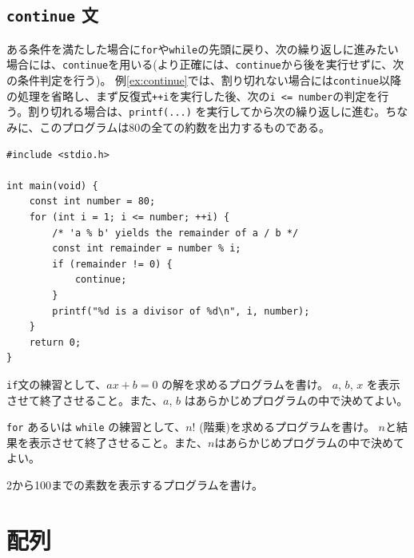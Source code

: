 \subsection{\texttt{continue} 文}
ある条件を満たした場合に\texttt{for}や\texttt{while}の先頭に戻り、次の繰り返しに進みたい場合には、\texttt{continue}を用いる(より正確には、\texttt{continue}から後を実行せずに、次の条件判定を行う)。 例\ref{ex:continue}では、割り切れない場合には\texttt{continue}以降の処理を省略し、まず反復式\texttt{++i}を実行した後、次の\texttt{i <= number}の判定を行う。割り切れる場合は、\texttt{printf(...)} を実行してから次の繰り返しに進む。ちなみに、このプログラムは80の全ての約数を出力するものである。
\begin{reidai}\label{ex:continue}
    \begin{verbatim}
#include <stdio.h>

int main(void) {
    const int number = 80;
    for (int i = 1; i <= number; ++i) {
        /* 'a % b' yields the remainder of a / b */
        const int remainder = number % i;
        if (remainder != 0) {
            continue;
        }
        printf("%d is a divisor of %d\n", i, number);
    }
    return 0;
}
\end{verbatim}
\end{reidai}
\begin{renshuu}\label{prob:2-1}
    \texttt{if}文の練習として、\(ax+b=0\) の解を求めるプログラムを書け。
    \(a\), \(b\), \(x\) を表示させて終了させること。また、\(a\), \(b\) はあらかじめプログラムの中で決めてよい。
\end{renshuu}

\begin{renshuu}\label{prob:2-2}
    \texttt{for} あるいは \texttt{while} の練習として、\(n!\) (階乗)を求めるプログラムを書け。
    \(n\)と結果を表示させて終了させること。また、\(n\)はあらかじめプログラムの中で決めてよい。
\end{renshuu}

\begin{renshuu}\label{prob:2-3}
    2から100までの素数を表示するプログラムを書け。
\end{renshuu}

\section{配列}
